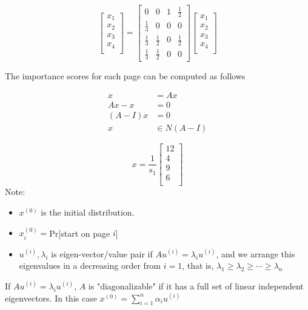 $$
\left[
\begin{matrix}
x_1 \\
x_2 \\
x_3\\
x_4\\
\end{matrix}
\right] =
\left[
\begin{matrix}
0 & 0 & 1 & \frac{1}{2} \\
\frac{1}{3} & 0 & 0& 0 \\
\frac{1}{3}& \frac{1}{2} & 0 & \frac{1}{2} \\
\frac{1}{3} & \frac{1}{2} & 0 & 0 
\end{matrix}
\right]
\left[
\begin{matrix}
x_1 \\
x_2 \\
x_3\\
x_4\\
\end{matrix}
\right]
$$

The importance scores for each page can be computed as follows

\begin{align*}
x &= Ax \\
Ax - x &= 0\\
(A - I)x &= 0\\
x&\in N(A-I)
\end{align*}


$$
x = \frac{1}{s_1}
\left[
\begin{matrix}
12 \\
4 \\
9\\
6\\
\end{matrix}
\right]
$$
Note: 

\begin{itemize}
	\item $x^{(0)}$ is the initial distribution.
	
	\item $x^{(0)}_i = $Pr[start on page $i$]
	
	\item $u^{(i)}, \lambda_i$ is eigen-vector/value pair if $Au^{(i)} = \lambda_iu^{(i)}$, and we arrange this eigenvalues in a decreasing order from $i=1$, that is, $\lambda_1\geq \lambda_2\geq\cdots\geq \lambda_n$
\end{itemize}


If $Au^{(i)} = \lambda_iu^{(i)}$, $A$ is "diagonalizable" if it has a full set of linear independent eigenvectors. In this case $x^{(0)} = \sum^n_{i=1}\alpha_iu^{(i)}$

